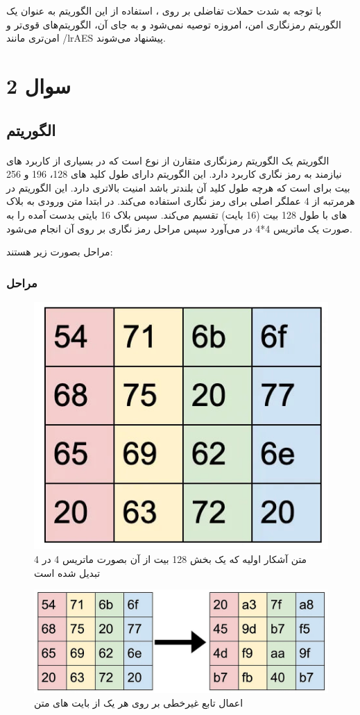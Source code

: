 با توجه به شدت حملات تفاضلی بر روی 
، استفاده از این الگوریتم به عنوان یک الگوریتم رمزنگاری امن، امروزه توصیه نمی‌شود و به جای آن، الگوریتم‌های قوی‌تر و امن‌تری مانند 
/lr{AES}
پیشنهاد می‌شوند.


\section{سوال 2}

\subsection{الگوریتم }

\paragraph{}
الگوریتم 
یک الگوریتم رمزنگاری متقارن از نوع 
است که در بسیاری از کاربرد های نیازمند به رمز نگاری کاربرد دارد. این الگوریتم دارای طول کلید های 128، 196 و 256 بیت برای است که هرچه طول کلید آن بلندتر باشد امنیت بالاتری دارد.
این الگوریتم در هرمرتبه از 4 عملگر اصلی برای رمز نگاری استفاده می‌کند. در ابتدا متن ورودی به بلاک های با طول 128 بیت (16 بایت) تقسیم می‌کند. سپس بلاک 16 بایتی بدست آمده را به صورت یک ماتریس 4*4 در می‌آورد سپس مراحل رمز نگاری بر روی آن انجام می‌شود.


مراحل بصورت زیر هستند:
\subsubsection{مراحل}

\begin{figure}[h!]
    \centering
    \includegraphics[width=0.5\linewidth]{images/initial text.jpg}
    \caption{متن آشکار اولیه که یک بخش 128 بیت از آن بصورت ماتریس 4 در 4 تبدیل شده است
    }
    \label{fig:init}
\end{figure}

\begin{figure}[h!]
    \centering
    \includegraphics[width=0.5\linewidth]{images/apply_sbox.jpg}
    \caption{اعمال تابع غیرخطی بر روی هر یک از بایت های متن}
    \label{fig:addsbox}
\end{figure}

